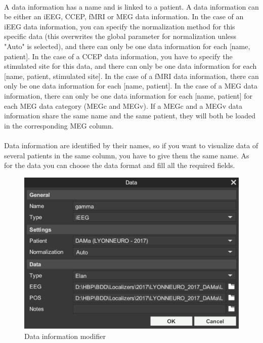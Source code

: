 \documentclass[a4paper]{article}
\begin{document}
\paragraph{} A data information has a name and is linked to a patient. A data information can be either an iEEG, CCEP, fMRI or MEG data information. In the case of an iEEG data information, you can specify the normalization method for this specific data (this overwrites the global parameter for normalization unless "Auto" is selected), and there can only be one data information for each [name, patient]. In the case of a CCEP data information, you have to specify the stimulated site for this data, and there can only be one data information for each [name, patient, stimulated site]. In the case of a fMRI data information, there can only be one data information for each [name, patient]. In the case of a MEG data information, there can only be one data information for each [name, patient] for each MEG data category (MEGc and MEGv). If a MEGc and a MEGv data information share the same name and the same patient, they will both be loaded in the corresponding MEG column.
\paragraph{} Data information are identified by their names, so if you want to visualize data of several patients in the same column, you have to give them the same name. As for the data you can choose the data format and fill all the required fields.
\begin{figure}[H]
\begin{center}
\includegraphics[scale=0.5]{DataInfoModifier.png}
\end{center}
\caption{\label{dataInfoModifierUI}Data information modifier}
\end{figure}
\end{document}
